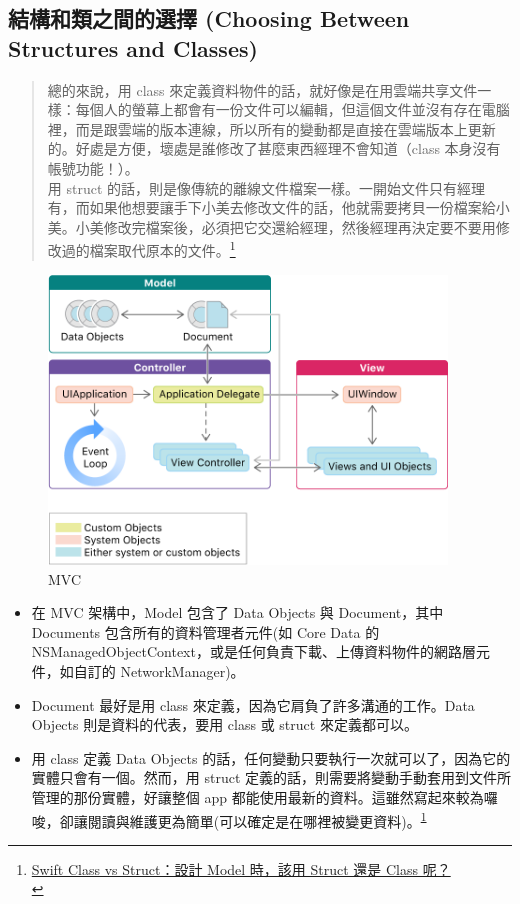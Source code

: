 \documentclass[a4paper,12pt]{article}
\begin{document}
\subsection{結構和類之間的選擇 (Choosing Between Structures and Classes)}
\label{sec:org294a42e}
\begin{verse}
總的來說，用 class 來定義資料物件的話，就好像是在用雲端共享文件一樣：每個人的螢幕上都會有一份文件可以編輯，但這個文件並沒有存在電腦裡，而是跟雲端的版本連線，所以所有的變動都是直接在雲端版本上更新的。好處是方便，壞處是誰修改了甚麼東西經理不會知道（class 本身沒有帳號功能！）。\\
\vspace*{1em}
用 struct 的話，則是像傳統的離線文件檔案一樣。一開始文件只有經理有，而如果他想要讓手下小美去修改文件的話，他就需要拷貝一份檔案給小美。小美修改完檔案後，必須把它交還給經理，然後經理再決定要不要用修改過的檔案取代原本的文件。\footnote{\href{https://www.appcoda.com.tw/swift-class/}{Swift Class vs Struct：設計 Model 時，該用 Struct 還是 Class 呢？}\\\label{org5073ec5}}\\
\end{verse}
\begin{figure}[htbp]
\centering
\includegraphics[width=400]{images/mvc-1.png}
\caption{\label{fig:MVC}MVC}
\end{figure}
\begin{itemize}
\item 在 MVC 架構中，Model 包含了 Data Objects 與 Document，其中 Documents 包含所有的資料管理者元件(如 Core Data 的 NSManagedObjectContext，或是任何負責下載、上傳資料物件的網路層元件，如自訂的 NetworkManager)。\\
\item Document 最好是用 class 來定義，因為它肩負了許多溝通的工作。Data Objects 則是資料的代表，要用 class 或 struct 來定義都可以。\\
\item 用 class 定義 Data Objects 的話，任何變動只要執行一次就可以了，因為它的實體只會有一個。然而，用 struct 定義的話，則需要將變動手動套用到文件所管理的那份實體，好讓整個 app 都能使用最新的資料。這雖然寫起來較為囉唆，卻讓閱讀與維護更為簡單(可以確定是在哪裡被變更資料)。\textsuperscript{\ref{org5073ec5}}\\
\end{itemize}
\end{document}
